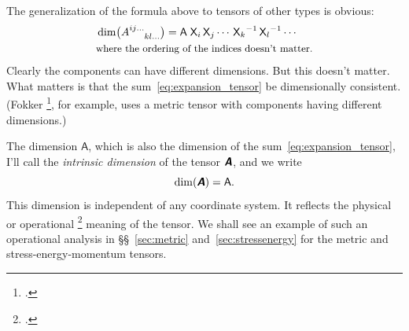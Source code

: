 \documentclass[a4paper,12pt,onecolumn,oneside,article,british]{memoir}
\newcommand*{\mathte}[1]{\textbf{\textit{\textsf{#1}}}}
\newcommand*{\citep}{\footcites}
\newcommand*{\sect}{\S}%
\newcommand*{\sects}{\S\S}%
\newcommand*{\Un}{\textsf{1}}
\newcommand*{\Le}{\textsf{L}}
\newcommand*{\Ti}{\textsf{T}}
\newcommand*{\Ma}{\textsf{M}}
\newcommand*{\Te}{\Theta}
\newcommand*{\Xx}{\textsf{X}}
\newcommand*{\Aa}{\textsf{A}}
\newcommand*{\yA}{\mathte{A}}
\renewcommand*{\i}{\indices}
\begin{document}
The generalization of the formula above to tensors of other types is obvious:
\begin{equation}
  \label{eq:dim_component_generic}
  \begin{aligned}
&\dim\bigl(A\i{^{ij\dotso}_{kl\dotso}}\bigr) = \Aa\;{\Xx_{i}}\,{\Xx_{j}}\dotsm\,
  {\Xx_{k}}^{-1}\,{\Xx_{l}}^{-1}\dotsm \\
  &\text{\small where the ordering of the indices doesn't matter.}
  \end{aligned}
\end{equation}
Clearly the components can have different dimensions. But this doesn't matter.
What matters is that the sum~\eqref{eq:expansion_tensor} be dimensionally
consistent. (Fokker \citep[\sect~VII.1 p.~88]{fokker1960_t1965}, for
example, uses a metric tensor with components having different dimensions.)

\medskip

The dimension $\Aa$, which is also the dimension of the
sum~\eqref{eq:expansion_tensor}, I'll call the \emph{intrinsic dimension}
of the tensor $\yA$, and we write
\begin{equation}
  \label{eq:abs_dim}
  \dim(\yA) = \Aa.
\end{equation}
This dimension is independent of any coordinate system. It reflects the
physical or operational \citep{bridgman1927_r1958}[see
also][\sect~A.2]{synge1960}[\sects~A.3--4]{truesdelletal1960} meaning of
the tensor. We shall see an example of such an operational analysis in
\sects~\ref{sec:metric} and~\ref{sec:stressenergy} for the metric and
stress-energy-momentum tensors.
\end{document}
